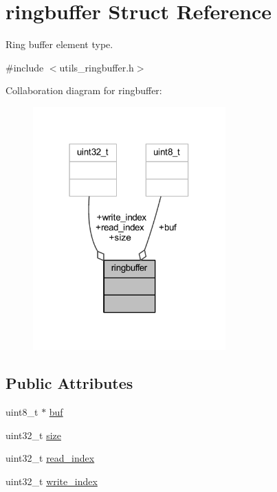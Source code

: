 \hypertarget{structringbuffer}{}\section{ringbuffer Struct Reference}
\label{structringbuffer}


Ring buffer element type.  




{\ttfamily \#include $<$utils\+\_\+ringbuffer.\+h$>$}



Collaboration diagram for ringbuffer\+:\nopagebreak
\begin{figure}[H]
\begin{center}
\leavevmode
\includegraphics[width=210pt]{structringbuffer__coll__graph}
\end{center}
\end{figure}
\subsection*{Public Attributes}
\begin{DoxyCompactItemize}
\item 
uint8\+\_\+t $\ast$ \hyperlink{structringbuffer_a21e527bd1cee84a7b2c3d6d2da77584c}{buf}
\item 
uint32\+\_\+t \hyperlink{structringbuffer_a80a0c2fba71bab6481fe1a0bab9685ae}{size}
\item 
uint32\+\_\+t \hyperlink{structringbuffer_a1690488f3cc00713f660ab13ee18be5e}{read\+\_\+index}
\item 
uint32\+\_\+t \hyperlink{structringbuffer_a93936ef6a8e070e065448dbf49dcc93b}{write\+\_\+index}
\end{DoxyCompactItemize}


